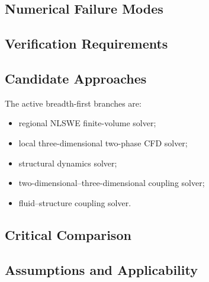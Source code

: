 
\subsection{Numerical Failure Modes}
\label{sec:res-num-spec-numerical-failure-modes}


\subsection{Verification Requirements}
\label{sec:res-num-spec-verification-requirements}


\subsection{Candidate Approaches}
\label{sec:res-num-spec-candidate-approaches}

The active breadth-first branches are:

\begin{itemize}
  \item regional NLSWE finite-volume solver;
  \item local three-dimensional two-phase CFD solver;
  \item structural dynamics solver;
  \item two-dimensional--three-dimensional coupling solver;
  \item fluid--structure coupling solver.
\end{itemize}

\subsection{Critical Comparison}
\label{sec:res-num-spec-critical-comparison}


\subsection{Assumptions and Applicability}
\label{sec:res-num-spec-assumptions}


